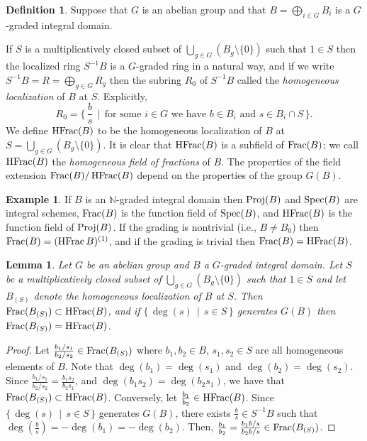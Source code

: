 \documentclass[12pt]{amsart}
\theoremstyle{plain}
\newtheorem{lemma}[subsection]{Lemma}
\theoremstyle{definition}
\newtheorem{definition}[subsection]{Definition}
\newtheorem{example}[subsection]{Example}
\newcommand{\Spec}{		\operatorname{{\rm Spec}}}
\newcommand{\Proj}{		\operatorname{{\rm Proj}}}
\newcommand{\Frac}{		\operatorname{{\rm Frac}}}
\newcommand{\HFrac}{		\operatorname{{\rm HFrac}}}
\newcommand{\setspec}[2]{\big\{\,#1\, \mid \,#2\, \big\}}
\newcommand{\Nat}{\ensuremath{\mathbb{N}}}
\begin{document}
	\begin{definition}
		Suppose that $G$ is an abelian group and that  $B = \bigoplus_{i \in G} B_i$ is a $G$-graded integral domain.
		
		If $S$ is a multiplicatively closed subset of $\bigcup_{g \in G} ( B_g \setminus \{0\})$ such that $1 \in S$ then the localized ring
		$S^{-1}B$ is a $G$-graded ring in a natural way, and if we write $S^{-1}B = R = \bigoplus_{g \in G} R_g$ then
		the subring $R_0$ of $S^{-1}B$ called the \textit{homogeneous localization} of $B$ at $S$.
		Explicitly,
		$$
		R_0 = \setspec{ \textstyle \frac bs }{ \text{for some $i \in G$ we have $b \in B_i$ and $s \in B_i \cap S$} } .
		$$
		We define $\HFrac(B)$ to be the homogeneous localization of $B$ at $S = \bigcup_{g \in G} ( B_g \setminus \{0\})$.
		It is clear that $\HFrac(B)$ is a subfield of $\Frac(B)$;
		we call $\HFrac(B)$ the \textit{homogeneous field of fractions} of $B$.
		The properties of the field extension $\Frac(B) / \HFrac(B)$ depend on the properties of the group $G(B)$.
	\end{definition}
	
	\begin{example} \label{HFracExample}
		If $B$ is an $\Nat$-graded integral domain then $\Proj(B)$ and $\Spec(B)$ are integral schemes,
		$\Frac(B)$ is the function field of $\Spec(B)$, and $\HFrac(B)$ is the function field of $\Proj(B)$.
		If the grading is nontrivial (i.e., $B \neq B_0$) then $\Frac(B) = (\HFrac B)^{(1)}$,
		and if the grading is trivial then $\Frac(B) = \HFrac(B)$.
	\end{example}
		
	\begin{lemma} \label {0dfvfb03eFfj}
		Let $G$ be an abelian group and $B$ a $G$-graded integral domain.
		Let $S$ be a multiplicatively closed subset of  $\bigcup_{g \in G} ( B_g \setminus \{0\})$ such that $1 \in S$
		and let $B_{(S)}$ denote the homogeneous localization of $B$ at $S$.
		Then $\Frac(B_{(S)}) \subset \HFrac(B)$, and if $\setspec{ \deg(s) }{ s \in S}$ generates $G(B)$ then
		$\Frac(B_{(S)}) = \HFrac(B)$.
	\end{lemma}
	
	\begin{proof}
		Let $\frac{b_1/s_1}{b_2/s_2} \in \Frac(B_{(S)})$ where $b_1,b_2 \in B$, $s_1,s_2 \in S$ are all homogeneous elements of $B$. Note that $\deg(b_1) = \deg(s_1)$ and $\deg(b_2) = \deg(s_2)$. Since $\frac{b_1/s_1}{b_2/s_2} = \frac{b_1 s_2}{b_2 s_1}$, and $\deg(b_1s_2) = \deg(b_2 s_1)$, we have that $\Frac(B_{(S)}) \subset \HFrac(B)$. Conversely, let $\frac{b_1}{b_2} \in \HFrac(B)$. Since $\setspec{ \deg(s) }{ s \in S}$ generates $G(B)$, there exists $\frac{b}{s} \in S^{-1}B$ such that $\deg(\frac{b}{s}) = -\deg(b_1) = -\deg(b_2)$. Then, $ \frac{b_1}{b_2} = \frac{b_1 b / s}{b_2 b / s} \in \Frac(B_{(S)})$.     
	\end{proof}
	
\end{document}
